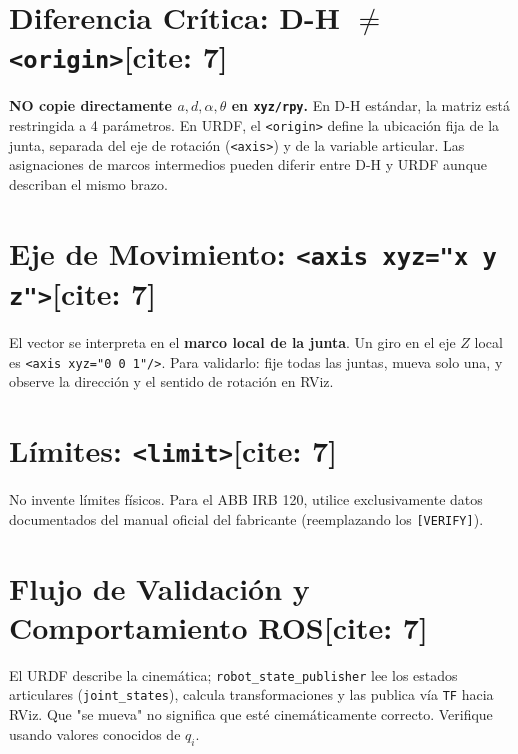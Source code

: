\documentclass[11pt, a4paper]{article}
\begin{document}
\section{Diferencia Crítica: D-H $\neq$ \texttt{<origin>}[cite: 7]}
\textbf{NO copie directamente $a, d, \alpha, \theta$ en \texttt{xyz/rpy}.} 
En D-H estándar, la matriz está restringida a 4 parámetros. En URDF, el \texttt{<origin>} define la ubicación fija de la junta, separada del eje de rotación (\texttt{<axis>}) y de la variable articular. Las asignaciones de marcos intermedios pueden diferir entre D-H y URDF aunque describan el mismo brazo.

\section{Eje de Movimiento: \texttt{<axis xyz="x y z">}[cite: 7]}
El vector se interpreta en el \textbf{marco local de la junta}. Un giro en el eje $Z$ local es \texttt{<axis xyz="0 0 1"/>}. Para validarlo: fije todas las juntas, mueva solo una, y observe la dirección y el sentido de rotación en RViz.

\section{Límites: \texttt{<limit>}[cite: 7]}
No invente límites físicos. Para el ABB IRB 120, utilice exclusivamente datos documentados del manual oficial del fabricante (reemplazando los \texttt{[VERIFY]}).

\section{Flujo de Validación y Comportamiento ROS[cite: 7]}
El URDF describe la cinemática; \texttt{robot\_state\_publisher} lee los estados articulares (\texttt{joint\_states}), calcula transformaciones y las publica vía \texttt{TF} hacia RViz. Que "se mueva" no significa que esté cinemáticamente correcto. Verifique usando valores conocidos de $q_i$.
\end{document}
